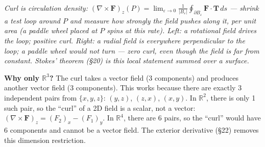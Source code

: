 \documentclass[11pt]{report}
\newcommand{\figcap}[1]{\\[1.5mm]\parbox{0.92\textwidth}{\small\itshape #1}}
\newcommand{\R}{\mathbb{R}}
\begin{document}
\begin{center}
%
\figcap{Curl is \textnormal{circulation density}: $(\nabla\times\mathbf{F})_z(P) = \lim_{\varepsilon\to 0} \frac{1}{|B_\varepsilon|}\oint_{\partial B_\varepsilon}\mathbf{F}\cdot\mathbf{T}\,ds$ --- shrink a test loop around $P$ and measure how strongly the field pushes along it, per unit area (a paddle wheel placed at $P$ spins at this rate). Left: a rotational field drives the loop; positive curl. Right: a radial field is everywhere perpendicular to the loop; a paddle wheel would not turn --- zero curl, even though the field is far from constant. Stokes' theorem (\S20) is this local statement summed over a surface.}
\end{center}

\textbf{Why only $\R^3$?} The curl takes a vector field (3 components) and produces another vector field (3 components). This works because there are exactly 3 independent pairs from $\{x, y, z\}$: $(y,z)$, $(z,x)$, $(x,y)$. In $\R^2$, there is only 1 such pair, so the ``curl'' of a 2D field is a scalar, not a vector: $(\nabla \times \mathbf{F})_z = (F_2)_x - (F_1)_y$. In $\R^4$, there are 6 pairs, so the ``curl'' would have 6 components and cannot be a vector field. The exterior derivative (\S22) removes this dimension restriction.
\end{document}
